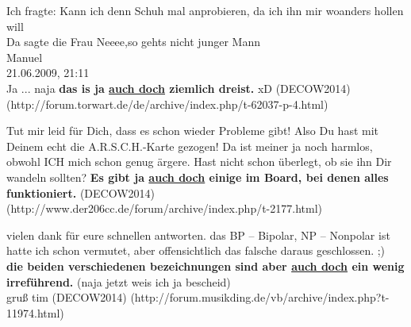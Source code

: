 {\begin{exe}
	\ex\label{1185} 
	\scriptsize
	Ich fragte: \glqq Kann ich denn Schuh mal anprobieren, da ich ihn mir woanders hollen will\grqq{}\\

	Da sagte die Frau \glqq Neeee,so gehts nicht junger Mann\grqq{}\\
	
	Manuel\\
	21.06.2009, 21:11\\
	Ja ... naja \textbf{das is ja \underline{auch doch} ziemlich dreist.} xD			
	\hfill\hbox{(DECOW2014)}	
	\newline
	\hbox{}\hfill\hbox{(http://forum.torwart.de/de/archive/index.php/t-62037-p-4.html)}
\end{exe}

\begin{exe}
	\ex\label{1186} 
	\scriptsize
	Tut mir leid für Dich, dass es schon wieder Probleme gibt! Also Du hast mit Deinem echt die A.R.S.C.H.-Karte gezogen! Da ist meiner ja noch harmlos, 		obwohl ICH mich schon genug ärgere. Hast nicht schon überlegt, ob sie ihn Dir wandeln sollten? \textbf{Es gibt ja \underline{auch doch} einige im 			Board, bei denen alles funktioniert.}
	\hfill\hbox{(DECOW2014)}	
	\newline
	\hbox{}\hfill\hbox{(http://www.der206cc.de/forum/archive/index.php/t-2177.html)}
\end{exe}

\begin{exe}
	\ex\label{1187} 
	\scriptsize
	vielen dank für eure schnellen antworten. das BP – Bipolar, NP – Nonpolar ist hatte ich schon vermutet, aber offensichtlich das falsche daraus 				geschlossen. ;)\\
	\textbf{die beiden verschiedenen bezeichnungen sind aber \underline{auch doch} ein wenig irreführend.} (naja jetzt weis ich ja bescheid)\\
	gruß tim 		
	\hfill\hbox{(DECOW2014)}	
	\newline
	\hbox{}\hfill\hbox{(http://forum.musikding.de/vb/archive/index.php?t-11974.html)}
\end{exe}

}
